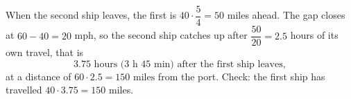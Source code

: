 When the second ship leaves, the first is $40\cdot\dfrac{5}{4}=50$ miles ahead. The gap closes at $60-40=20$ mph, so the second ship catches up after $\dfrac{50}{20}=2.5$ hours of its own travel, that is
\[
\boxed{3.75\text{ hours (3 h 45 min) after the first ship leaves}},
\]
at a distance of $60\cdot2.5=\boxed{150\text{ miles}}$ from the port. Check: the first ship has travelled $40\cdot3.75=150$ miles.
